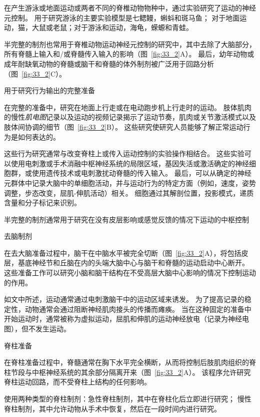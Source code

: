 \begin{proposition}[用于研究运动神经元控制的制剂] \label{box:33_1}
	
	\quad \quad 在产生游泳或地面运动或两者不同的脊椎动物物种中，通过实验研究了运动的神经元控制。
	用于研究游泳的主要实验模型是七鳃鳗，蝌蚪和斑马鱼；
	对于地面运动，猫，大鼠或老鼠；对于游泳和运动，海龟，蝾螈和青蛙。
	
	\quad \quad 半完整的制剂也常用于脊椎动物运动神经元控制的研究中，其中去除了大脑部分，所有脊髓上输入和/或脊髓传入输入的影响（图~\ref{fig:33_2}A）。
	最后，幼年动物或成年耐缺氧动物的脊髓或脑干和脊髓的体外制剂被广泛用于回路分析（图~\ref{fig:33_2}C）。
	
	\quad \quad 用于研究行为输出的完整准备
	
	\quad \quad 在完整的准备中，研究在地面上行走或在电动跑步机上行走时的运动。
	肢体肌肉的慢性\textit{肌电图}记录以及运动的视频记录揭示了运动节奏，肌肉或关节激活模式以及肢体间协调的细节（图~\ref{fig:33_2}B）。
	这些研究使研究人员能够了解正常运动行为是如何表达的。
	
	\quad \quad 这些行为研究通常与改变脊柱上或传入运动控制的实验操作相结合。
	这些实验可以使用电刺激或手术消融中枢神经系统的局限区域，基因失活或激活确定的神经细胞群，或使用遗传技术或电刺激扰动脊髓的传入输入。
	最后，可以从确定的神经元群体中记录大脑中的单细胞活动，并与运动行为的特定方面（例如，速度，姿势调整，步态改变，屈肌-伸肌活动）相关。
	细胞通过其解剖位置，投影模式，递质含量和分子标记来识别。
	
	\quad \quad 半完整的制剂通常用于研究在没有皮层影响或感觉反馈的情况下运动的中枢控制
	
	\quad \quad 去脑制剂
	
	\quad \quad 在去大脑准备过程中，脑干在中脑水平被完全切断（图~\ref{fig:33_2}A），将包括皮层，基底神经节和丘脑在内的头端大脑中心与脑干和脊髓的运动启动中心断开。
	这些准备工作可以研究小脑和脑干结构在不受高层大脑中心影响的情况下控制运动的作用。
	
	\quad \quad 如文中所述，运动通常通过电刺激脑干中的运动区域来诱发。
	为了提高记录的稳定性，动物通常会通过阻断神经肌肉接头的传播而瘫痪。
	当在这种固定的准备中开始运动时，通常被称为虚拟运动，屈肌和伸肌的运动神经放电（记录为神经电图），但不发生运动。
	
	\quad \quad 脊柱准备
	
	\quad \quad 在脊柱准备过程中，脊髓通常在胸下水平完全横断，从而将控制后肢肌肉组织的脊柱节段与中枢神经系统的其余部分隔离开来（图~\ref{fig:33_2}A）。
	该程序允许研究脊柱运动回路，而不受脊柱上结构的任何影响。
	
	\quad \quad 使用两种类型的脊柱制剂：急性脊柱制剂，其中在脊柱化后立即进行研究；
	慢性脊柱制剂，其中允许动物从手术中恢复，然后在一段时间内进行研究。
	

\end{proposition}

